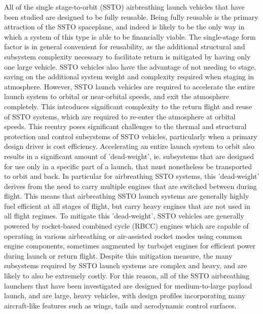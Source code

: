 All of the single stage-to-orbit (SSTO) airbreathing launch vehicles that have been studied are designed to be fully reusable. Being fully reusable is the primary attraction of the SSTO spaceplane, and indeed is likely to be the only way in which a system of this type is able to be financially viable. 
The single-stage form factor is in general convenient for reusability, as the additional structural and subsystem complexity necessary to facilitate return is mitigated by having only one large vehicle. SSTO vehicles also have the advantage of not needing to stage, saving on the additional system weight and complexity required when staging in atmosphere. 
However, SSTO launch vehicles are required to accelerate the entire launch system to orbital or near-orbital speeds, and exit the atmosphere completely. This introduces significant complexity to the return flight and reuse of SSTO systems, which are required to re-enter the atmosphere at orbital speeds\cite{NASP}. This reentry poses significant challenges to the thermal and structural protection and control subsystems of SSTO vehicles, particularly when a primary design driver is cost efficiency.
 Accelerating an entire launch system to orbit also results in a significant amount of 'dead-weight', ie. subsystems that are designed for use only in a specific part of a launch, that must nonetheless be transported to orbit and back. In particular for airbreathing SSTO systems, this 'dead-weight' derives from the need to carry multiple engines that are switched between during flight. This means that airbreathing SSTO launch systems are generally highly fuel efficient at all stages of flight, but carry heavy engines that are not used in all flight regimes. 
To mitigate this 'dead-weight', SSTO vehicles are generally powered by rocket-based combined cycle (RBCC) engines which are capable of operating in various airbreathing or air-assisted rocket modes using common engine components, sometimes augmented by turbojet engines for efficient power during launch or return flight. Despite this mitigation measure, the many subsystems required by SSTO launch systems are complex and heavy, and are likely to also be extremely costly.
For this reason, all of the SSTO airbreathing launchers that have been investigated are designed for medium-to-large payload launch, and are large, heavy vehicles, with design profiles incorporating many aircraft-like features such as wings, tails and aerodynamic control surfaces. 


